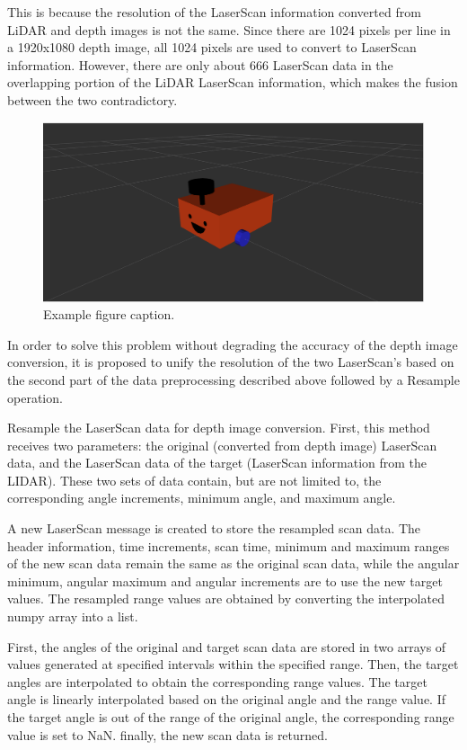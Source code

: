 This is because the resolution of the LaserScan information converted from LiDAR and depth images is not the same. Since there are 1024 pixels per line in a 1920x1080 depth image, all 1024 pixels are used to convert to LaserScan information. However, there are only about 666 LaserScan data in the overlapping portion of the LiDAR LaserScan information, which makes the fusion between the two contradictory.
\begin{figure}[H]
    \centering
    \includegraphics[width=0.8\linewidth]{figs/robot.png}
    \caption{Example figure caption.}
\end{figure}
In order to solve this problem without degrading the accuracy of the depth image conversion, it is proposed to unify the resolution of the two LaserScan's based on the second part of the data preprocessing described above followed by a Resample operation.

Resample the LaserScan data for depth image conversion. First, this method receives two parameters: the original (converted from depth image) LaserScan data, and the LaserScan data of the target (LaserScan information from the LIDAR). These two sets of data contain, but are not limited to, the corresponding angle increments, minimum angle, and maximum angle.

A new LaserScan message is created to store the resampled scan data. The header information, time increments, scan time, minimum and maximum ranges of the new scan data remain the same as the original scan data, while the angular minimum, angular maximum and angular increments are to use the new target values. The resampled range values are obtained by converting the interpolated numpy array into a list.

First, the angles of the original and target scan data are stored in two arrays of values generated at specified intervals within the specified range. Then, the target angles are interpolated to obtain the corresponding range values. The target angle is linearly interpolated based on the original angle and the range value. If the target angle is out of the range of the original angle, the corresponding range value is set to NaN. finally, the new scan data is returned.

